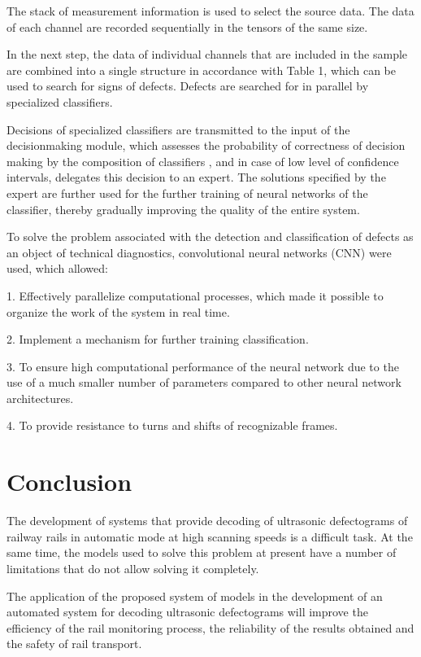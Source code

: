 \documentclass[a4paper, 12pt]{article}
\begin{document}
The stack of measurement information is used to select the source data. The data of each channel are recorded sequentially in the tensors of the same size.

In the next step, the data of individual channels that are included in the sample are combined into a single structure in accordance with Table 1, which can be used to search for signs of defects. Defects are searched for in parallel by specialized classifiers.

Decisions of specialized classifiers are transmitted to the input of the decisionmaking module, which assesses the probability of correctness of decision making by the composition of classifiers \cite{Yaman2008}, and in case of low level of confidence intervals, delegates this decision to an expert. The solutions specified by the expert are further used for the further training of neural networks of the classifier, thereby gradually improving the quality of the entire system.

To solve the problem associated with the detection and classification of defects as an object of technical diagnostics, convolutional neural networks (CNN) were used, which allowed:

1. Effectively parallelize computational processes, which made it possible to organize the work of the system in real time.

2. Implement a mechanism for further training classification.

3. To ensure high computational performance of the neural network due to the use of a much smaller number of parameters compared to other neural network architectures.

4. To provide resistance to turns and shifts of recognizable frames.

\section{Conclusion}

The development of systems that provide decoding of ultrasonic defectograms of railway rails in automatic mode at high scanning speeds is a difficult task. At the same time, the models used to solve this problem at present have a number of limitations that do not allow solving it completely.

The application of the proposed system of models in the development of an automated system for decoding ultrasonic defectograms will improve the efficiency of the rail monitoring process, the reliability of the results obtained and the safety of rail transport.
\end{document}
